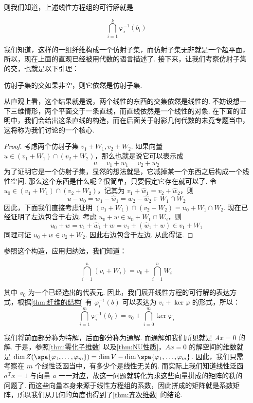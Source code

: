 则我们知道，上述线性方程组的可行解就是

\[
\bigcap_{i = 1}^k \varphi_i^{-1} (b_i)
\]

我们知道，这样的一组纤维构成一个仿射子集，而仿射子集无非就是一个超平面，所以，现在上面的直观已经被用代数的语言描述了. 接下来，让我们考察仿射子集的交，也就是以下引理：

\begin{lemma}{}{}
    仿射子集的交如果非空，则它依然是仿射子集.
\end{lemma}

从直观上看，这个结果就是说，两个线性的东西的交集依然是线性的. 不妨设想一下三维情形，两个平面交于一条直线，而直线依然是一个线性的对象. 在下面的证明中，我们会给出这条直线的构造，而在后面关于射影几何代数的未竟专题当中，这将称为我们讨论的一个核心.

\begin{proof}
    考虑两个仿射子集 $v_1 + W_1, v_2 + W_2$. 如果向量 $u \in (v_1 + W_1) \cap (v_2 + W_2)$，那么也就是说它可以表示成
    \[
    u = v_1 + w_1 = v_2 + w_2
    \]
    为了证明它是一个仿射子集，显然的想法就是，它减掉某一个东西之后构成一个线性空间. 那么这个东西是什么呢？很简单，只要假定它存在就可以了. 令 $u_0 \in (v_1 + W_1) \cap (v_2 + W_2)$，记其为 $v_1 + \hat w_1 = v_2 + \hat w_2$，则
    \[
    u - u_0 = w_1 - \hat w_1 = w_2 - \hat w_2 \in W_1 \cap W_2
    \]
    因此，下面我们直接考虑证明 $(v_1 + W_1) \cap (v_2 + W_2) = u_0 + W_1 \cap W_2$. 现在已经证明了左边包含于右边. 考虑 $u_0 + w \in u_0 + W_1 \cap W_2$，则
    \[
    u_0 + w = v_1 + \hat w_1 + w = v_1 + (\hat w_1 + w) \in v_1 + W_1
    \]
    同理可证 $u_0 + w \in v_2 + W_2$. 因此右边包含于左边. 从此得证.
\end{proof}

参照这个构造，应用归纳法，我们知道：

\[
\bigcap_{i = 1}^n (v_i + W_i) = v_0 + \bigcap_{i = 1}^n W_i
\]

其中 $v_0$ 为一个已经选出的代表元. 因此，我们展开线性方程的可行解的表达方式，根据\autoref{thm:纤维的结构} 有 $\varphi_i^{-1}(b)$ 可以表达为 $v_i + \ker \varphi$ 的形式，所以：
\[
\bigcap_{i = 1}^m \varphi_i^{-1} (b_i) = v_0 + \bigcap_{i = 0}^m \ker \varphi_i
\]

我们将前面部分称为特解，后面部分称为通解. 而通解如我们所见就是 $Ax = 0$ 的解. 于是，参照\autoref{thm:零化子维数} 以及\autoref{thm:NU性质}，$Ax = 0$ 的解空间的维数就是 $\dim Z(\spa\{\varphi_1,\ldots,\varphi_m\}) = \dim V - \dim\spa\{\varphi_1,\ldots,\varphi_m\}$. 因此，我们只需考察在 $m$ 个线性泛函当中，有多少个是线性无关的. 而实际上我们知道线性泛函 $a^\mathrm{T}x = 1$ 与向量 $a$ 一一对应，故这一问题就转化为求这些向量拼成的矩阵的秩的问题了. 而这些向量本身来源于线性方程组的系数，因此拼成的矩阵就是系数矩阵，所以我们从几何的角度也得到了\autoref{thm:齐次维数} 的结论.

